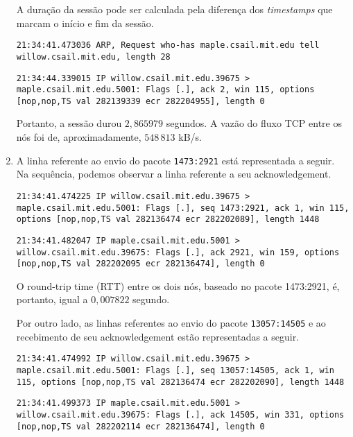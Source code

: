 \documentclass[a4paper,10pt]{article}
\begin{document}
\begin{enumerate}
A duração da sessão pode ser calculada pela diferença dos \textit{timestamps} que marcam o início e fim da sessão.

\begin{lstlisting}
21:34:41.473036 ARP, Request who-has maple.csail.mit.edu tell willow.csail.mit.edu, length 28
\end{lstlisting}
\begin{lstlisting}
21:34:44.339015 IP willow.csail.mit.edu.39675 > maple.csail.mit.edu.5001: Flags [.], ack 2, win 115, options [nop,nop,TS val 282139339 ecr 282204955], length 0
\end{lstlisting}

Portanto, a sessão durou $2,865979$ segundos. A vazão do fluxo TCP entre os nós foi de, aproximadamente, $548\,813$ kB/s.


\item A linha referente ao envio do pacote {\tt 1473:2921} está representada a seguir. Na sequência, podemos observar a linha referente a seu acknowledgement.

\begin{lstlisting}
21:34:41.474225 IP willow.csail.mit.edu.39675 > maple.csail.mit.edu.5001: Flags [.], seq 1473:2921, ack 1, win 115, options [nop,nop,TS val 282136474 ecr 282202089], length 1448
\end{lstlisting}
\begin{lstlisting}
21:34:41.482047 IP maple.csail.mit.edu.5001 > willow.csail.mit.edu.39675: Flags [.], ack 2921, win 159, options [nop,nop,TS val 282202095 ecr 282136474], length 0
\end{lstlisting}

O round-trip time (RTT) entre os dois nós, baseado no pacote 1473:2921, é, portanto, igual a $0,007822$ segundo.

Por outro lado, as linhas referentes ao envio do pacote {\tt 13057:14505} e ao recebimento de seu acknowledgement estão representadas a seguir.

\begin{lstlisting}
21:34:41.474992 IP willow.csail.mit.edu.39675 > maple.csail.mit.edu.5001: Flags [.], seq 13057:14505, ack 1, win 115, options [nop,nop,TS val 282136474 ecr 282202090], length 1448
\end{lstlisting}
\begin{lstlisting}
21:34:41.499373 IP maple.csail.mit.edu.5001 > willow.csail.mit.edu.39675: Flags [.], ack 14505, win 331, options [nop,nop,TS val 282202114 ecr 282136474], length 0
\end{lstlisting}


\end{enumerate}
\end{document}
